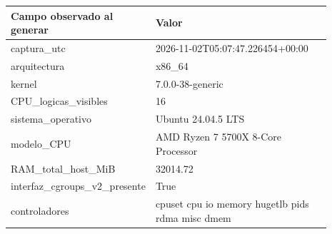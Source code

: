 \begin{longtable}{p{0.34\linewidth}p{0.55\linewidth}}
\toprule
Campo observado al generar & Valor \\
\midrule\endhead
captura\_\allowbreak{}utc & 2026-\allowbreak{}11-\allowbreak{}02T05:07:47.\allowbreak{}226454+00:00 \\
arquitectura & x86\_\allowbreak{}64 \\
kernel & 7.\allowbreak{}0.\allowbreak{}0-\allowbreak{}38-\allowbreak{}generic \\
CPU\_\allowbreak{}logicas\_\allowbreak{}visibles & 16 \\
sistema\_\allowbreak{}operativo & Ubuntu 24.\allowbreak{}04.\allowbreak{}5 LTS \\
modelo\_\allowbreak{}CPU & AMD Ryzen 7 5700X 8-\allowbreak{}Core Processor \\
RAM\_\allowbreak{}total\_\allowbreak{}host\_\allowbreak{}MiB & 32014.\allowbreak{}72 \\
interfaz\_\allowbreak{}cgroups\_\allowbreak{}v2\_\allowbreak{}presente & True \\
controladores & cpuset cpu io memory hugetlb pids rdma misc dmem \\
\bottomrule\end{longtable}